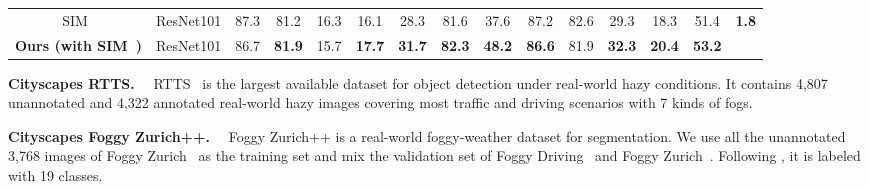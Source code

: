 \documentclass[10pt,journal,compsoc]{IEEEtran}
\renewcommand{\paragraph}[1]{\noindent\textbf{#1}~~}
\begin{document}
\begin{table*}{}
{\begin{tabular}{c|c|ccccccccccc|c|c}
\midrule
SIM~\cite{SIM} & ResNet101 &87.3	&81.2	&16.3	&16.1	&28.3	&81.6	&37.6	&87.2	&82.6	&29.3	&18.3	&51.4 &\multirow{2}{*}{\textbf{1.8}} \\
\textbf{Ours (with SIM~\cite{SIM})} & ResNet101 &86.7 	&\textbf{81.9}	 &15.7	 &\textbf{17.7}	 &\textbf{31.7}	 &\textbf{82.3}	 &\textbf{48.2}	 &\textbf{86.6}	 &81.9	 &\textbf{32.3}	 &\textbf{20.4}	 &\textbf{53.2} &
\\
\bottomrule
\end{tabular}
}
\end{table*}


\begin{table}{}
\caption{Synthetic-to-real adaptation of object detection from SIM10K to Cityscapes (default dimension is style). 
}
\label{table:sim10k_det}
\centering
{}
\end{table}


\paragraph{Cityscapes  RTTS.} RTTS~\cite{RTTS}
is the largest available dataset for object detection under real-world hazy conditions. It contains 4,807 unannotated and 4,322 annotated real-world hazy images covering 
most traffic and driving scenarios with 7 kinds of fogs. 


\paragraph{Cityscapes  Foggy Zurich++.} Foggy Zurich++ is a real-world foggy-weather dataset  for segmentation. We use all the unannotated 3,768 images of Foggy Zurich~\cite{FoggyCity} as the training set and mix the validation set of Foggy Driving~\cite{FoggyDriving} and Foggy Zurich~\cite{FoggyCity}. Following \cite{cordts2016cityscapes}, it is labeled with 19 classes. 
\end{document}

